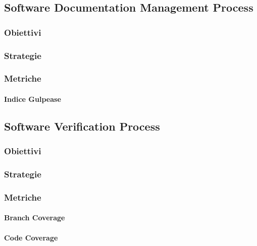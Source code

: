 	\subsection{Software Documentation Management Process}
		\subsubsection{Obiettivi}
		\subsubsection{Strategie}
		\subsubsection{Metriche}
			\paragraph{Indice Gulpease}	

	\subsection{Software Verification Process}
		\subsubsection{Obiettivi}
		\subsubsection{Strategie}
		\subsubsection{Metriche}
			\paragraph{Branch Coverage}	
			\paragraph{Code Coverage}	
				